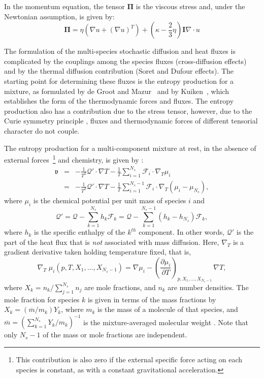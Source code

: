\documentclass[11pt]{article}
\newcommand{\HeatFlux}{\boldsymbol{\mathcal{Q}}}
\newcommand{\SpeciesFlux}{\boldsymbol{\mathcal{F}}}
\newcommand{\StressTensor}{\boldsymbol{\Pi}}
\newcommand{\EntropyProduction}{\mathfrak{v}}
\begin{document}
In the momentum equation, the tensor $\StressTensor$ is the viscous stress and, under the Newtonian assumption, is given by:
\begin{equation}
\StressTensor = \eta ( \nabla u + ( \nabla u )^T) + ( \kappa - \frac{2}{3} \eta) \mathbf{I} \nabla \cdot u
\end{equation}

The formulation of the multi-species stochastic diffusion and heat fluxes is complicated by the couplings among the species fluxes (cross-diffusion effects) and by the thermal diffusion contribution (Soret and Dufour effects).
The starting point for determining these fluxes
is the entropy production for a mixture, as formulated by de Groot and Mazur~\cite{DM_63} and by Kuiken~\cite{NewIrrevThermoBook},
which establishes the form of the thermodynamic forces and fluxes.
The entropy production also has a contribution due to the stress tensor, however,
due to the Curie symmetry principle \cite{DM_63}, fluxes and thermodynamic forces of different tensorial
character do not couple.

The entropy production for a
multi-component mixture at rest, in the absence of external forces~\footnote{This contribution
is also zero if the external specific force
acting on each species is constant, as with a constant gravitational acceleration.} and chemistry,
is given by \cite{DM_63}:
%
\begin{eqnarray}
\EntropyProduction &=&
-\frac{1}{T^2} \HeatFlux' \cdot \nabla T
- \frac{1}{T} \sum_{i=1}^{N_s} \SpeciesFlux_i \cdot \nabla_T \mu_i \\
&=& -\frac{1}{T^2} \HeatFlux' \cdot \nabla T
- \frac{1}{T} \sum_{i=1}^{N_s-1} \SpeciesFlux_i \cdot \nabla_T \left(\mu_i - \mu_{N_s} \right ),
\label{eq:dGM1}
\end{eqnarray}
%
where $\mu_i$ is the chemical potential per unit mass of species $i$ and
\begin{equation}
\HeatFlux' = \HeatFlux - \sum_{k=1}^{N_s} h_k \SpeciesFlux_k
= \HeatFlux - \sum_{k=1}^{N_s-1} (h_k-h_{N_s}) \SpeciesFlux_k,
\end{equation}
where $h_k $ is the specific enthalpy of the $k^{th}$ component.
In other words, $\HeatFlux'$ is the part of the heat flux that is \emph{not} associated with mass diffusion.
Here, $\nabla_T$ is a gradient derivative taken holding temperature fixed, that is,
\[
\nabla_T  \; \mu_i(p,T,X_1, \ldots, X_{N_s-1}) = \nabla \mu_i -
\left(\frac{\partial \mu_i}{\partial T}\right)_{p,X_1, \ldots, X_{N_s-1}}\, \nabla T,
\]
where $X_k=n_k/\sum_{j=1}^{N_s} n_j$ are mole fractions, and $n_k$ are number densities.
The mole fraction for species $k$ is given in terms of the mass fractions by $X_k = ({\overline{m}}/{m_k}) Y_k$,
where $m_k$ is the
mass of a molecule of that species, and $\overline{m}=\left( \sum_{k=1}^{N_s}Y_k / m_k \right)^{-1}$ is the mixture-averaged molecular weight \cite{NewIrrevThermoBook}.  Note that only $N_s-1$ of the mass or mole fractions are independent.
%
\end{document}
